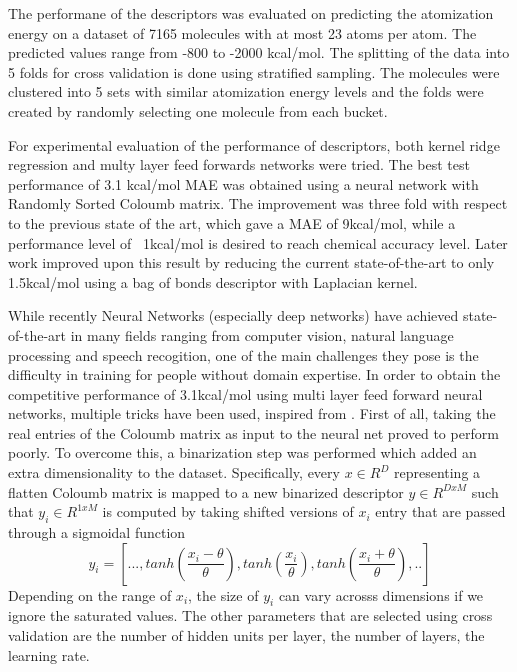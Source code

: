 \documentclass[10pt,journal,a4paper]{IEEEtran}
\begin{document}
The performane of the descriptors was evaluated on predicting the atomization energy on a dataset of 7165 molecules with at most 23 atoms per atom. The predicted values range from -800 to -2000 kcal/mol. The splitting of the data into 5 folds for cross validation is done using stratified sampling. The molecules were clustered into 5 sets with similar atomization energy levels and the folds were created by randomly selecting one molecule from each bucket.

For experimental evaluation of the performance of descriptors, both kernel ridge regression and multy layer feed forwards networks were tried. The best test performance of 3.1 kcal/mol MAE was obtained using a neural network with
 Randomly Sorted Coloumb matrix. The improvement was three fold with respect to the previous state of the art, which gave a MAE of 9kcal/mol, while a performance level of ~1kcal/mol is desired to reach chemical accuracy level.
Later work \cite{bob} improved upon this result by reducing the current state-of-the-art to only 1.5kcal/mol using a bag of bonds descriptor with Laplacian kernel.


While recently Neural Networks (especially deep networks) have achieved state-of-the-art in many fields ranging from computer vision, natural language processing and speech recogition, one of the main challenges they pose is the difficulty in training for people without domain expertise. 
In order to obtain the competitive performance of 3.1kcal/mol using multi layer feed forward neural networks, multiple tricks have been used, inspired from \cite{tricks}. First of all, taking the real entries of the Coloumb matrix as input to the neural net proved to perform poorly.
To overcome this, a binarization step was performed which added an extra dimensionality to the dataset. Specifically, every $x \in R^{D}$ representing a flatten Coloumb matrix is mapped to a new binarized descriptor $y \in R^{DxM}$ such that $y_i \in R^{1xM}$ is computed by taking shifted versions of $x_i$ entry that are passed through a sigmoidal function
\begin{equation}
	y_i = [..., tanh(\frac{x_i - \theta}{\theta}), tanh(\frac{x_i}{\theta}), tanh(\frac{x_i + \theta}{\theta}),..]
\end{equation}
Depending on the range of $x_i$, the size of $y_i$ can vary acrosss dimensions if we ignore the saturated values.
The other parameters that are selected using cross validation are the number of hidden units per layer, the number of layers, the learning rate.
\end{document}
